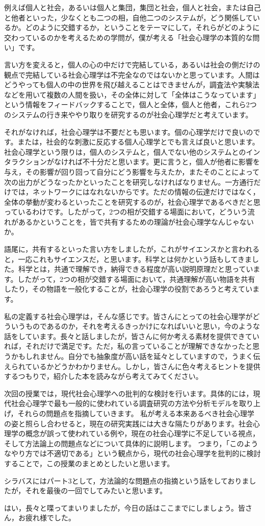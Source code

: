 \documentclass{ltjsbook}
\begin{document}
例えば個人と社会，あるいは個人と集団，集団と社会，個人と社会，または自己と他者といった，少なくとも二つの相，自他二つのシステムが，どう関係しているか。どのように交錯するか，ということをテーマにして，それらがどのように交わっているのかを考えるための学問が，僕が考える「社会心理学の本質的な問い」です。

言い方を変えると，個人の心の中だけで完結している，あるいは社会の側だけの観点で完結している社会心理学は不完全なのではないかと思っています。人間はどうやっても個人の中の世界を飛び越えることはできませんが，調査法や実験法などを用いて複数の人間を扱い，その全体に対して「全体はこうなっています」という情報をフィードバックすることで，個人と全体，個人と他者，これら2つのシステムの行き来ややり取りを研究するのが社会心理学だと考えています。

それがなければ，社会心理学は不要だとも思います。個の心理学だけで良いのです。または，社会的な刺激に反応する個人心理学とでも言えば良いと思います。社会心理学という限りは，個人のシステムと，個人でない他のシステムとのインタラクションがなければ不十分だと思います。更に言うと，個人が他者に影響を与え，その影響が回り回って自分にどう影響を与えたか，またそのことによって次の出力がどうなったかといったことを研究しなければなりません。一方通行だけでは，ネットワークにはなれないからです。ただの情報の伝達だけではなく，全体の挙動が変わるといったことを研究するのが，社会心理学であるべきだと思っているわけです。したがって，2つの相が交錯する場面において，どういう流れがあるかということを，皆で共有するための理論が社会心理学なんじゃないか。

語尾に，共有するといった言い方をしましたが，これがサイエンスかと言われると，一応これもサイエンスだ，と思います。科学とは何かという話もしてきました。科学とは，共通で理解でき，納得できる程度が高い説明原理だと思っています。したがって，2つの相が交錯する場面において，共通理解が高い物語を共有したり，その物語を一般化することが，社会心理学の役割であろうと考えています。

私の定義する社会心理学は，そんな感じです。皆さんにとっての社会心理学がどういうものであるのか，それを考えるきっかけになればいいと思い，今のような話をしています。長々と話しましたが，皆さんに何か考える素材を提供できていれば，それだけで満足です。ただ，私の言っていることが理解できなかったと思うかもしれません。自分でも抽象度が高い話を延々としていますので，うまく伝えられているかどうかわかりません。しかし，皆さんに色々考えるヒントを提供するつもりで，紹介した本を読みながら考えてみてください。

次回の授業では，現代社会心理学への批判的な検討を行います。具体的には，現代社会心理学で最も一般的に使われている調査研究の方法や分析モデルを取り上げ，それらの問題点を指摘していきます。
私が考える本来あるべき社会心理学の姿と照らし合わせると，現在の研究実践には大きな隔たりがあります。社会心理学の概念が誤って使われている例や，現在の社会心理学に不足している視点，そして方法論上の問題点などについて具体的に説明します。
つまり，「このようなやり方では不適切である」という観点から，現代の社会心理学を批判的に検討することで，この授業のまとめとしたいと思います。

シラバスにはパート3として，方法論的な問題点の指摘という話をしておりましたが，それを最後の一回でしてみたいと思います。

はい，長々と喋ってまいりましたが，今日の話はここまでにしましょう。皆さん，お疲れ様でした。
\end{document}
